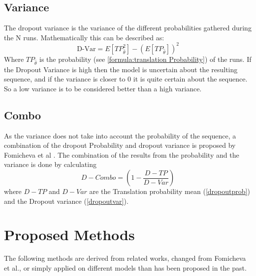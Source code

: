 \subsection{Variance}
\label{dropoutvar}
The dropout variance is the variance of the different probabilities gathered during the N runs. 
Mathematically this can be described as:
$$\text{D-Var}=E[TP_{\hat\theta}^2]-(E[TP_{\hat\theta}])^2\label{formula:dropoutvariance}$$
Where $TP_{\hat\theta}$ is the probability (see \autoref{formula:translation Probability}) of the runs. 
If the Dropout Variance is high then the model is uncertain about the resulting sequence, and if the variance is closer to 0 it is quite certain about the sequence.
So a low variance is to be considered better than a high variance.

\subsection{Combo}
As the variance does not take into account the probability of the sequence, a combination of the dropout Probability and dropout variance is proposed by Fomicheva et al \cite{fomicheva2020unsupervised}. 
The combination of the results from the probability and the variance is done by calculating $$D-Combo=(1-\frac{D-TP}{D-Var})\label{formula:Dropoutcombo}$$ where $D-TP$ and $D-Var$ are the Translation probability mean (\autoref{dropoutprob}) and the Dropout variance (\autoref{dropoutvar}).

\section{Proposed Methods}
The following methods are derived from related works, changed from Fomicheva et al., or simply applied on different models than has been proposed in the past. 

